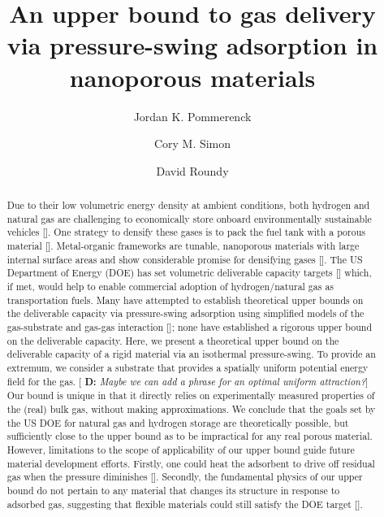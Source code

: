 \documentclass[letterpaper,twocolumn,amsmath,amssymb,jcp]{revtex4-1}
\newcommand{\blue}[1]{{\bf \color{blue} #1}}
\newcommand{\davidsays}[1]{{\color{red} [\blue{D:} \emph{#1}]}}
\begin{document}
\title{
An upper bound to gas delivery via pressure-swing adsorption in nanoporous materials}

\author{Jordan K. Pommerenck}
\author{Cory M. Simon}
\author{David Roundy}

\begin{abstract}
  Due to their low volumetric energy density at ambient conditions, both hydrogen and natural gas are challenging to economically store onboard environmentally sustainable vehicles []. One strategy to densify these gases is to pack the fuel tank with a porous material [].
  Metal-organic frameworks are tunable, nanoporous materials with large internal surface areas and show considerable promise for densifying gases []. The US Department of Energy (DOE) has set volumetric deliverable capacity targets [] which, if met, would help to enable commercial adoption of hydrogen/natural gas as transportation fuels. Many have attempted to establish theoretical upper bounds on the deliverable capacity via pressure-swing adsorption using simplified models of the gas-substrate and gas-gas interaction []; none have established a rigorous upper bound on the deliverable capacity.
  Here, we present a theoretical upper bound on the deliverable capacity of a rigid material via an isothermal pressure-swing. %
  To provide an extremum, we consider a substrate that provides a spatially uniform potential energy field for the gas. 
  \davidsays{Maybe we can add a phrase for an optimal uniform attraction?}
  Our bound is unique in that it directly relies on experimentally measured properties of the (real) bulk gas, without making approximations.
  We conclude that the goals set by the US DOE for natural gas and hydrogen storage are theoretically possible, but sufficiently close to the upper bound as to be impractical for any real porous material.
  However, limitations to the scope of applicability of our upper bound guide future material development efforts.
  Firstly, one could heat the adsorbent to drive off residual gas when the pressure diminishes [].
  Secondly, the fundamental physics of our upper bound do not pertain to
  any material that changes its structure in response to adsorbed gas, suggesting that flexible materials could still satisfy the DOE target [].
\end{abstract}
\end{document}
